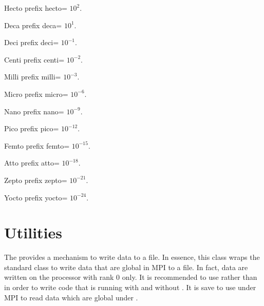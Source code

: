 \begin{datadesc}{Hecto}
prefix hecto= $10^2$.
 \end{datadesc}

\begin{datadesc}{Deca}
prefix deca= $10^1$.
 \end{datadesc}

\begin{datadesc}{Deci}
prefix deci= $10^{-1}$.
 \end{datadesc}

\begin{datadesc}{Centi}
prefix centi= $10^{-2}$. 
\end{datadesc}

\begin{datadesc}{Milli}
prefix milli= $10^{-3}$.
\end{datadesc}

\begin{datadesc}{Micro}
prefix micro= $10^{-6}$.
 \end{datadesc}

\begin{datadesc}{Nano}
prefix nano= $10^{-9}$.
 \end{datadesc}

\begin{datadesc}{Pico}
prefix pico= $10^{-12}$.
 \end{datadesc}

\begin{datadesc}{Femto}
prefix femto= $10^{-15}$.
 \end{datadesc}

\begin{datadesc}{Atto}
prefix atto= $10^{-18}$.
 \end{datadesc}

\begin{datadesc}{Zepto}
prefix zepto= $10^{-21}$.
 \end{datadesc}

\begin{datadesc}{Yocto}
prefix yocto= $10^{-24}$.
 \end{datadesc}


\section{Utilities}

The  provides a mechanism to write data to a file. 
In essence, this class wraps the standard  class to write data 
that are global in MPI to a file. In fact, data are written on the processor 
with \MPI rank 0 only. It is recommended to use  
rather than  in order to write code that is running 
with and without \MPI. It is save to use  under MPI to read data which are global under \MPI.

